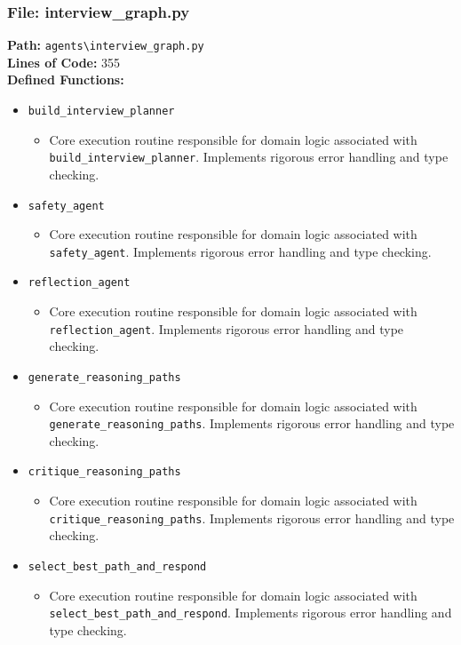 \documentclass[10pt,journal,compsoc]{IEEEtran}
\begin{document}
\subsubsection{File: interview\_graph.py}
\textbf{Path:} \texttt{agents\textbackslash{}interview\_graph.py} \\
\textbf{Lines of Code:} 355 \\
\textbf{Defined Functions:}
\begin{itemize}
    \item \texttt{build\_interview\_planner}
    \begin{itemize} \item Core execution routine responsible for domain logic associated with \texttt{build\_interview\_planner}. Implements rigorous error handling and type checking. \end{itemize}
    \item \texttt{safety\_agent}
    \begin{itemize} \item Core execution routine responsible for domain logic associated with \texttt{safety\_agent}. Implements rigorous error handling and type checking. \end{itemize}
    \item \texttt{reflection\_agent}
    \begin{itemize} \item Core execution routine responsible for domain logic associated with \texttt{reflection\_agent}. Implements rigorous error handling and type checking. \end{itemize}
    \item \texttt{generate\_reasoning\_paths}
    \begin{itemize} \item Core execution routine responsible for domain logic associated with \texttt{generate\_reasoning\_paths}. Implements rigorous error handling and type checking. \end{itemize}
    \item \texttt{critique\_reasoning\_paths}
    \begin{itemize} \item Core execution routine responsible for domain logic associated with \texttt{critique\_reasoning\_paths}. Implements rigorous error handling and type checking. \end{itemize}
    \item \texttt{select\_best\_path\_and\_respond}
    \begin{itemize} \item Core execution routine responsible for domain logic associated with \texttt{select\_best\_path\_and\_respond}. Implements rigorous error handling and type checking. \end{itemize}

\end{itemize}
\end{document}
